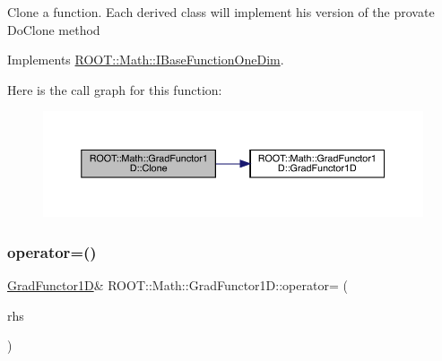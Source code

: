 Clone a function. Each derived class will implement his version of the provate Do\+Clone method 

Implements \mbox{\hyperlink{classROOT_1_1Math_1_1IBaseFunctionOneDim_a656dbb4dfc43e8d1566442bfb1a717fd}{R\+O\+O\+T\+::\+Math\+::\+I\+Base\+Function\+One\+Dim}}.

Here is the call graph for this function\+:
\nopagebreak
\begin{figure}[H]
\begin{center}
\leavevmode
\includegraphics[width=350pt]{d3/d76/classROOT_1_1Math_1_1GradFunctor1D_ab8280aaf240a374fb7a67808d858af79_cgraph}
\end{center}
\end{figure}
\mbox{\label{classROOT_1_1Math_1_1GradFunctor1D_a3ea006d92100ba76a6fae9f57499c60d}} 
\subsubsection{\texorpdfstring{operator=()}{operator=()}\hspace{0.1cm}{\footnotesize\ttfamily [1/2]}}
{\footnotesize\ttfamily \mbox{\hyperlink{classROOT_1_1Math_1_1GradFunctor1D}{Grad\+Functor1D}}\& R\+O\+O\+T\+::\+Math\+::\+Grad\+Functor1\+D\+::operator= (\begin{DoxyParamCaption}\item[{const \mbox{\hyperlink{classROOT_1_1Math_1_1GradFunctor1D}{Grad\+Functor1D}} \&}]{rhs }\end{DoxyParamCaption})\hspace{0.3cm}{\ttfamily [inline]}}

